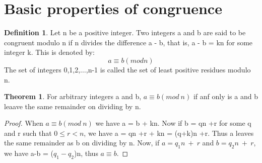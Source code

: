 \documentclass[15,a4paper]{report}
\theoremstyle{definition}
\newtheorem{definition}{Definition}[section]
\newtheorem{theorem}{Theorem}[section]
\theoremstyle{remark}
\begin{document}
    \section{Basic properties of congruence}
        \begin{definition}
            Let n be a positive integer. Two integers a and b are said to be congruent modulo n if n divides the difference a - b, that is, a - b = kn for some integer k. This is denoted by: \[ a \equiv b(mod n)\]
            The set of integers 0,1,2,$\dots$,n-1 is called the set of least positive residues modulo n.
        \end{definition}
        \begin{theorem}
            For arbitrary integers a and b, $a \equiv b( mod ~n)$ if anf only is a and b leaave the same remainder on dividing by n.
        \end{theorem}
            \begin{proof}
                When $a \equiv b(mod~ n)$ we have a = b + kn. Now if b = qn +r for some q and r such that $0 \leq r < n$, we have a = qn +r + kn = (q+k)n +r. Thus a leaves the same remainder as b on dividing by n.
                Now, if $a=q_1n ~+~ r$ and $b=q_2n ~+~ r$, we have a-b = ($q_1 - q_2$)n, thus $ a\equiv b$.
            \end{proof}
            \newpage
\end{document}
